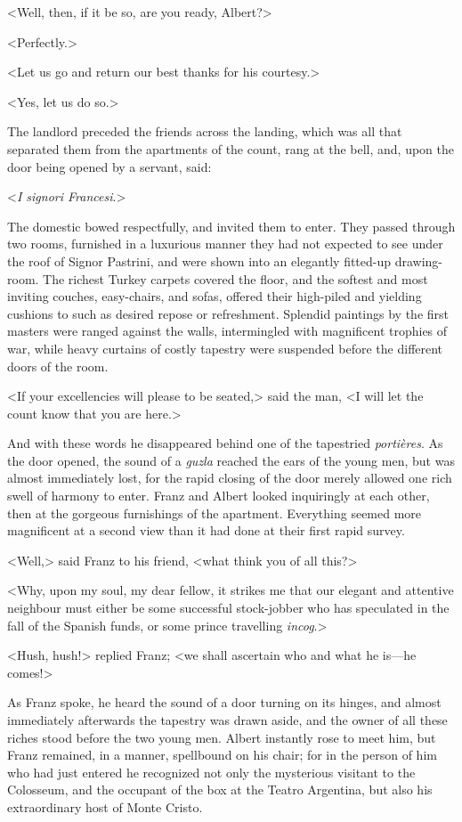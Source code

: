  <Well, then, if it be so, are you ready, Albert?> 

 <Perfectly.> 

 <Let us go and return our best thanks for his courtesy.> 

 <Yes, let us do so.> 

 The landlord preceded the friends across the landing, which was all that separated them from the apartments of the count, rang at the bell, and, upon the door being opened by a servant, said: 

 <\textit{I signori Francesi}.> 

 The domestic bowed respectfully, and invited them to enter. They passed through two rooms, furnished in a luxurious manner they had not expected to see under the roof of Signor Pastrini, and were shown into an elegantly fitted-up drawing-room. The richest Turkey carpets covered the floor, and the softest and most inviting couches, easy-chairs, and sofas, offered their high-piled and yielding cushions to such as desired repose or refreshment. Splendid paintings by the first masters were ranged against the walls, intermingled with magnificent trophies of war, while heavy curtains of costly tapestry were suspended before the different doors of the room. 

 <If your excellencies will please to be seated,> said the man, <I will let the count know that you are here.> 

 And with these words he disappeared behind one of the tapestried \textit{portières}. As the door opened, the sound of a \textit{guzla} reached the ears of the young men, but was almost immediately lost, for the rapid closing of the door merely allowed one rich swell of harmony to enter. Franz and Albert looked inquiringly at each other, then at the gorgeous furnishings of the apartment. Everything seemed more magnificent at a second view than it had done at their first rapid survey. 

 <Well,> said Franz to his friend, <what think you of all this?> 

 <Why, upon my soul, my dear fellow, it strikes me that our elegant and attentive neighbour must either be some successful stock-jobber who has speculated in the fall of the Spanish funds, or some prince travelling \textit{incog}.> 

 <Hush, hush!> replied Franz; <we shall ascertain who and what he is—he comes!> 

 As Franz spoke, he heard the sound of a door turning on its hinges, and almost immediately afterwards the tapestry was drawn aside, and the owner of all these riches stood before the two young men. Albert instantly rose to meet him, but Franz remained, in a manner, spellbound on his chair; for in the person of him who had just entered he recognized not only the mysterious visitant to the Colosseum, and the occupant of the box at the Teatro Argentina, but also his extraordinary host of Monte Cristo.